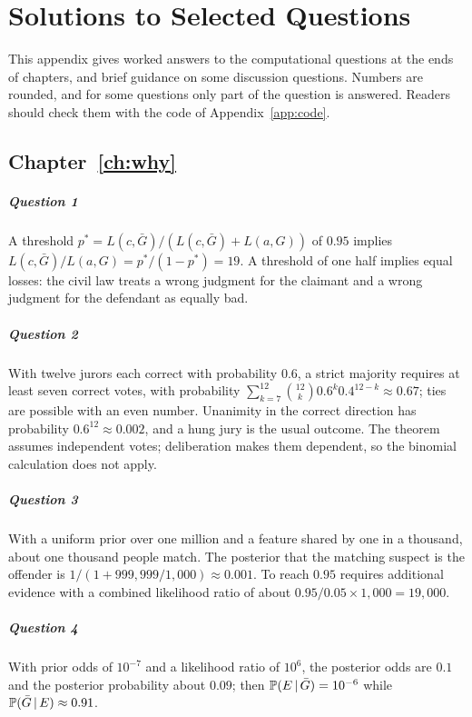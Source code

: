 \chapter{Solutions to Selected Questions}
\label{app:solutions}

This appendix gives worked answers to the computational questions at the ends of chapters, and brief guidance on some discussion questions. Numbers are rounded, and for some questions only part of the question is answered. Readers should check them with the code of Appendix~\ref{app:code}.

\section*{Chapter~\ref{ch:why}}
\paragraph{Question 1} A threshold $p^\ast = L(c,\bar G)/(L(c,\bar G)+L(a,G))$ of $0.95$ implies $L(c,\bar G)/L(a,G) = p^\ast/(1-p^\ast) = 19$. A threshold of one half implies equal losses: the civil law treats a wrong judgment for the claimant and a wrong judgment for the defendant as equally bad.
\paragraph{Question 2} With twelve jurors each correct with probability $0.6$, a strict majority requires at least seven correct votes, with probability $\sum_{k=7}^{12}\binom{12}{k}0.6^k0.4^{12-k}\approx 0.67$; ties are possible with an even number. Unanimity in the correct direction has probability $0.6^{12}\approx 0.002$, and a hung jury is the usual outcome. The theorem assumes independent votes; deliberation makes them dependent, so the binomial calculation does not apply.
\paragraph{Question 3} With a uniform prior over one million and a feature shared by one in a thousand, about one thousand people match. The posterior that the matching suspect is the offender is $1/(1 + 999{,}999/1{,}000)\approx 0.001$. To reach $0.95$ requires additional evidence with a combined likelihood ratio of about $0.95/0.05 \times 1{,}000 = 19{,}000$.
\paragraph{Question 4} With prior odds of $10^{-7}$ and a likelihood ratio of $10^6$, the posterior odds are $0.1$ and the posterior probability about $0.09$; then $\mathbb{P}(E\,\vert\,\bar G) = 10^{-6}$ while $\mathbb{P}(\bar G\,\vert\, E)\approx 0.91$.
